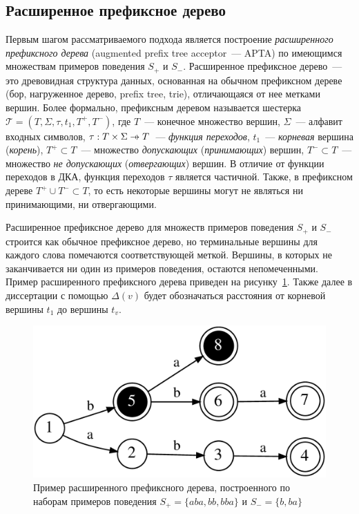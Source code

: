 \subsection{Расширенное префиксное дерево}
\label{sec:review:sat-dfa-inf:apta}
Первым шагом рассматриваемого подхода является построение \emph{расширенного префиксного дерева} (augmented prefix tree acceptor~{---} APTA) по имеющимся множествам примеров поведения $S_{+}$ и $S_{-}$. 
Расширенное префиксное дерево~--- это древовидная структура данных, основанная на обычном префиксном дереве (бор, нагруженное дерево, prefix tree, trie), отличающаяся от нее метками вершин.
Более формально, префиксным деревом называется шестерка $\mathcal{T} = \left(T,\Sigma,\tau,t_{1},T^{+}, T^{-}\right)$, где $T$~{---} конечное множество вершин, $\Sigma$~{---} алфавит входных символов, $\tau: T \times \Sigma \pto T$~{---} \emph{функция переходов}, $t_{1}$~{---} \emph{корневая} вершина (\emph{корень}), $T^{+} \subset T$~{---} множество \emph{допускающих} (\emph{принимающих}) вершин, $T^{-} \subset T$~{---} множество \emph{не допускающих} (\emph{отвергающих}) вершин.
В отличие от функции переходов в ДКА, функция переходов $\tau$ является частичной. 
Также, в префиксном дереве $T^{+} \cup T^{-} \subset T$, то есть некоторые вершины могут не являться ни принимающими, ни отвергающими. 

Расширенное префиксное дерево для множеств примеров поведения $S_{+}$ и $S_{-}$ строится как обычное префиксное дерево, но терминальные вершины для каждого слова помечаются соответствующей меткой. Вершины, в которых не заканчивается ни один из примеров поведения, остаются непомеченными. Пример расширенного префиксного дерева приведен на рисунку~\ref{img:apta-ex}.
Также далее в диссертации с помощью $\Delta(v)$ будет обозначаться расстояния от корневой вершины $t_{1}$ до вершины $t_{v}$.

\begin{figure}[ht]
  \centering
  \includegraphics[scale=0.14]{img/datamod/FIG2a.eps}
  \caption{Пример расширенного префиксного дерева, построенного по наборам примеров поведения $S_{+} = \{aba, bb, bba\}$ и $S_{-} = \{b, ba\}$}
  \label{img:apta-ex}
\end{figure}


